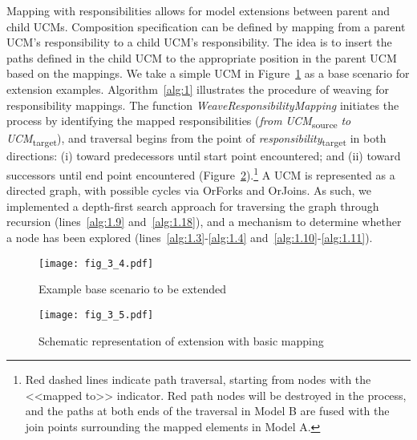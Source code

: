 Mapping with responsibilities allows for model extensions between parent and child UCMs. Composition specification can be defined by mapping from a parent UCM's responsibility to a child UCM's responsibility. The idea is to insert the paths defined in the child UCM to the appropriate position in the parent UCM based on the mappings. We take a simple UCM in Figure~\ref{fig:3.4} as a base scenario for extension examples. Algorithm~\ref{alg:1} illustrates the procedure of weaving for responsibility mappings. The function \emph{WeaveResponsibilityMapping} initiates the process by identifying the mapped responsibilities (\emph{from} \emph{UCM}\textsubscript{source} \emph{to} \emph{UCM}\textsubscript{target}), and traversal begins from the point of \emph{responsibility}\textsubscript{target} in both directions: (i) toward predecessors until start point encountered; and (ii) toward successors until end point encountered (Figure~\ref{fig:3.5}).\footnote{Red dashed lines indicate path traversal, starting from nodes with the <<mapped to>> indicator. Red path nodes will be destroyed in the process, and the paths at both ends of the traversal in Model B are fused with the join points surrounding the mapped elements in Model A.} A UCM is represented as a directed graph, with possible cycles via {\cls OrFork}s and {\cls OrJoin}s. As such, we implemented a depth-first search approach for traversing the graph through recursion (lines~\ref{alg:1.9} and~\ref{alg:1.18}), and a mechanism to determine whether a node has been explored (lines~\ref{alg:1.3}-\ref{alg:1.4} and~\ref{alg:1.10}-\ref{alg:1.11}).

\begin{figure}
	\centering
	\texttt{[image: fig\_3\_4.pdf]}
	\caption{Example base scenario to be extended}
	\label{fig:3.4}
\end{figure}

\begin{figure}[h]
	\centering
	\texttt{[image: fig\_3\_5.pdf]}
	\caption{Schematic representation of extension with basic mapping}
	\label{fig:3.5}
\end{figure}

